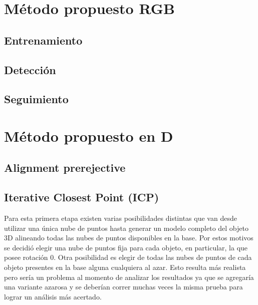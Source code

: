 \section{Método propuesto RGB}
\subsection{Entrenamiento}
\subsection{Detección}
\subsection{Seguimiento}

\section{Método propuesto en D}
\subsection{Alignment prerejective}\label{alignment_prerejective}

\subsection{Iterative Closest Point (ICP)}

Para esta primera etapa existen varias posibilidades distintas que van desde utilizar una única nube de puntos hasta generar un modelo completo del objeto 3D alineando todas las nubes de puntos disponibles en la base.  Por estos motivos se decidió elegir una nube de puntos fija para cada objeto, en particular, la que posee rotación 0. Otra posibilidad es elegir de todas las nubes de puntos de cada objeto presentes en la base alguna cualquiera al azar. Esto resulta más realista pero sería un problema al momento de analizar los resultados ya que se agregaría una variante azarosa y se deberían correr muchas veces la misma prueba para lograr un análisis más acertado.


